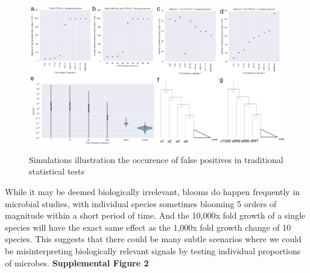 \begin{figure}[H]
        \centering
        \includegraphics[width=1\textwidth]{appendix_b/sup_figure1.png}
        \caption[A benchmark of statistical tests on compositional data.]{Simulations illustration the occurence of false positives in
          traditional statistical tests}
        \label{figbS1}
\end{figure}
While it may be deemed biologically irrelevant, blooms do happen frequently in microbial studies, with individual species sometimes blooming 5 orders of magnitude within a short period of time.  And the 10,000x fold growth of a single species will have the exact same effect as the 1,000x fold growth change of 10 species.  This suggests that there could be many subtle scenarios where we could be misinterpreting biologically relevant signals by testing individual proportions of microbes.\newpage
\textbf{Supplemental Figure 2}

